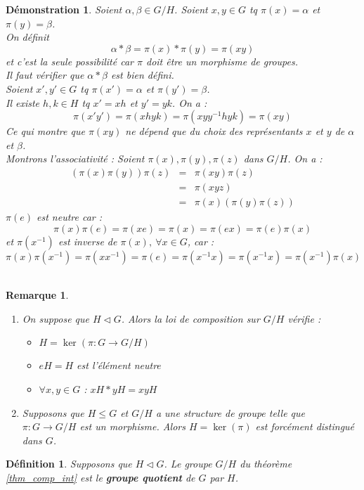 \documentclass[a4paper, oneside]{report}
\theoremstyle{break}
\newtheorem{defi}[thm]{Définition}
\newtheorem{remar}[thm]{Remarque}
\newtheorem*{demo}{Démonstration}
\begin{document}
\begin{demo}
Soient $\alpha, \beta \in G/H$. Soient $x,y\in G$ tq $\pi (x)=\alpha$ et $\pi(y)=\beta$.\\
On définit 
$$ \alpha * \beta = \pi(x) * \pi(y)=\pi(xy)$$
et c'est la seule possibilité car $\pi$ doit être un morphisme de groupes.\\
Il faut vérifier que $\alpha * \beta$ est bien défini.\\
Soient $x',y'\in G$ tq $\pi(x')=\alpha$ et $\pi(y')=\beta$.\\
Il existe $h,k\in H$ tq $x'=xh$ et $y'=yk$. On a :
$$\pi(x'y')=\pi(xhyk)=\pi(xyy^{-1}hyk)=\pi(xy)$$
Ce qui montre que $\pi(xy)$ ne dépend que du choix des représentants $x$ et $y$ de $\alpha$ et $\beta$.\\
Montrons l'associativité : Soient $\pi (x),\pi(y),\pi(z)$ dans $G/H$. On a :
$$\begin{array}{lll}
(\pi(x)\pi(y))\pi(z)&=&\pi(xy)\pi(z)\\
&=&\pi(xyz)\\
&=&\pi(x)(\pi(y)\pi(z))
\end{array}$$
$\pi(e)$ est neutre car :
$$\pi(x)\pi(e)=\pi(xe)=\pi(x)=\pi(ex)=\pi(e)\pi(x)$$
et $\pi(x^{-1})$ est inverse de $\pi(x),~\forall x\in G$, car :
$$\pi(x)\pi(x^{-1})=\pi(xx^{-1})=\pi(e)=\pi(x^{-1}x)=\pi(x^{-1}x)=\pi(x^{-1})\pi(x)$$
~
\end{demo}

\begin{remar}
\begin{enumerate}
\item On suppose que $H\vartriangleleft G$. Alors la loi de composition sur $G/H$ vérifie :
\begin{itemize}
\item $H=\ker (\pi : G \rightarrow G/H)$
\item $eH=H$ est l'élément neutre
\item $\forall x, y\in G$ : $xH * yH = xyH$
\end{itemize}

\item Supposons que $H\leq G$ et $G/H$ a une structure de groupe telle que $\pi:G \rightarrow G/H$ est un morphisme. Alors $H=\ker (\pi)$ est forcément distingué dans $G$.
\end{enumerate}
\end{remar}


\begin{defi}
Supposons que $H\vartriangleleft G$. Le groupe $G/H$ du théorème \ref{thm_comp_int} est le \textbf{groupe quotient} de $G$ par $H$.
\end{defi}
\end{document}

